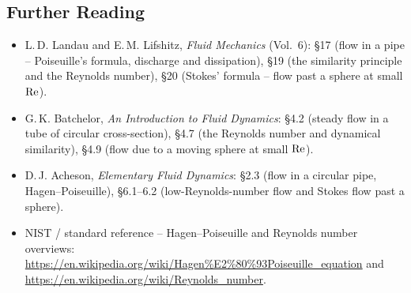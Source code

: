 \documentclass[../main.tex]{subfiles}
\begin{document}
\subsection*{Further Reading}
\begin{itemize}
  \item L.\,D. Landau and E.\,M. Lifshitz, \textit{Fluid Mechanics} (Vol.\ 6): \S17 (flow in a pipe -- Poiseuille's formula, discharge and dissipation), \S19 (the similarity principle and the Reynolds number), \S20 (Stokes' formula -- flow past a sphere at small $\mathrm{Re}$).
  \item G.\,K. Batchelor, \textit{An Introduction to Fluid Dynamics}: \S4.2 (steady flow in a tube of circular cross-section), \S4.7 (the Reynolds number and dynamical similarity), \S4.9 (flow due to a moving sphere at small $\mathrm{Re}$).
  \item D.\,J. Acheson, \textit{Elementary Fluid Dynamics}: \S2.3 (flow in a circular pipe, Hagen--Poiseuille), \S6.1--6.2 (low-Reynolds-number flow and Stokes flow past a sphere).
  \item NIST / standard reference -- Hagen--Poiseuille and Reynolds number overviews: \url{https://en.wikipedia.org/wiki/Hagen\%E2\%80\%93Poiseuille_equation} and \url{https://en.wikipedia.org/wiki/Reynolds_number}.
\end{itemize}
\end{document}
